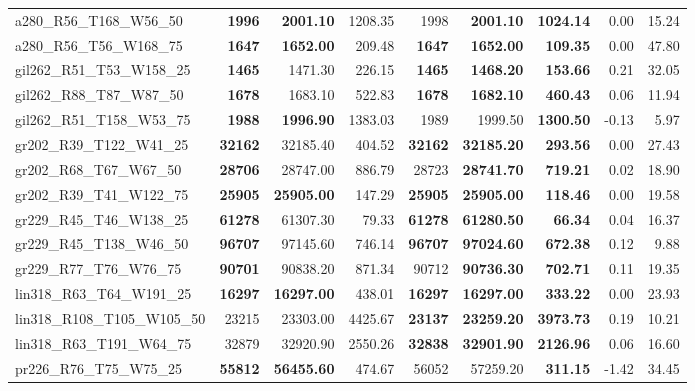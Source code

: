 \documentclass{singlecol-new}
\begin{document}
{\begin{longtable}{lrrrrrrrr}
		a280\_R56\_T168\_W56\_50 & \textbf{1996} & \textbf{2001.10} & 1208.35 & 1998 & \textbf{2001.10} & \textbf{1024.14} & 0.00 & 15.24 \\
		a280\_R56\_T56\_W168\_75 & \textbf{1647} & \textbf{1652.00} & 209.48 & \textbf{1647} & \textbf{1652.00} & \textbf{109.35} & 0.00 & 47.80 \\
		gil262\_R51\_T53\_W158\_25 & \textbf{1465} & 1471.30 & 226.15 & \textbf{1465} & \textbf{1468.20} & \textbf{153.66} & 0.21 & 32.05 \\
		gil262\_R88\_T87\_W87\_50 & \textbf{1678} & 1683.10 & 522.83 & \textbf{1678} & \textbf{1682.10} & \textbf{460.43} & 0.06 & 11.94 \\
		gil262\_R51\_T158\_W53\_75 & \textbf{1988} & \textbf{1996.90} & 1383.03 & 1989 & 1999.50 & \textbf{1300.50} & -0.13 & 5.97 \\
		gr202\_R39\_T122\_W41\_25 & \textbf{32162} & 32185.40 & 404.52 & \textbf{32162} & \textbf{32185.20} & \textbf{293.56} & 0.00 & 27.43 \\
		gr202\_R68\_T67\_W67\_50 & \textbf{28706} & 28747.00 & 886.79 & 28723 & \textbf{28741.70} & \textbf{719.21} & 0.02 & 18.90 \\
		gr202\_R39\_T41\_W122\_75 & \textbf{25905} & \textbf{25905.00} & 147.29 & \textbf{25905} & \textbf{25905.00} & \textbf{118.46} & 0.00 & 19.58 \\
		gr229\_R45\_T46\_W138\_25 & \textbf{61278} & 61307.30 & 79.33 & \textbf{61278} & \textbf{61280.50} & \textbf{66.34} & 0.04 & 16.37 \\
		gr229\_R45\_T138\_W46\_50 & \textbf{96707} & 97145.60 & 746.14 & \textbf{96707} & \textbf{97024.60} & \textbf{672.38} & 0.12 & 9.88 \\
		gr229\_R77\_T76\_W76\_75 & \textbf{90701} & 90838.20 & 871.34 & 90712 & \textbf{90736.30} & \textbf{702.71} & 0.11 & 19.35 \\
		lin318\_R63\_T64\_W191\_25 & \textbf{16297} & \textbf{16297.00} & 438.01 & \textbf{16297} & \textbf{16297.00} & \textbf{333.22} & 0.00 & 23.93 \\
		lin318\_R108\_T105\_W105\_50 & 23215 & 23303.00 & 4425.67 & \textbf{23137} & \textbf{23259.20} & \textbf{3973.73} & 0.19 & 10.21 \\
		lin318\_R63\_T191\_W64\_75 & 32879 & 32920.90 & 2550.26 & \textbf{32838} & \textbf{32901.90} & \textbf{2126.96} & 0.06 & 16.60 \\
		pr226\_R76\_T75\_W75\_25 & \textbf{55812} & \textbf{56455.60} & 474.67 & 56052 & 57259.20 & \textbf{311.15} & -1.42 & 34.45 \\

\end{longtable}}
\end{document}
